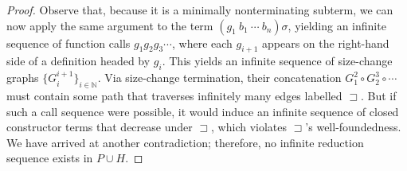 \documentclass{article}
\newtheorem{lemma}[theorem]{Lemma}
\theoremstyle{definition}
\renewcommand\em{\bfseries}
\newcommand{\supterm}{\sqsupset}
\begin{document}
\begin{proof}
    Observe that, because it is a minimally nonterminating subterm, we can now apply the same argument to the term $(g_1 ~ b_1 ~ \cdots ~ b_n)\sigma$, yielding an infinite sequence of function calls $g_1 g_2 g_3 \cdots$, where each $g_{i+1}$ appears on the right-hand side of a definition headed by $g_i$. This yields an infinite sequence of size-change graphs $\{G_i^{i+1}\}_{i \in \mathbb{N}}$. Via size-change termination, their concatenation $G_1^2 \circ G_2^3 \circ \cdots$ must contain some path that traverses infinitely many edges labelled $\supterm$. But if such a call sequence were possible, it would induce an infinite sequence of closed constructor terms that decrease under $\supterm$, which violates $\supterm$'s well-foundedness. We have arrived at another contradiction; therefore, no infinite reduction sequence exists in $P \cup H$.
\end{proof}





\renewcommand\em{\it}
\printbibliography[title={References}]
\end{document}
